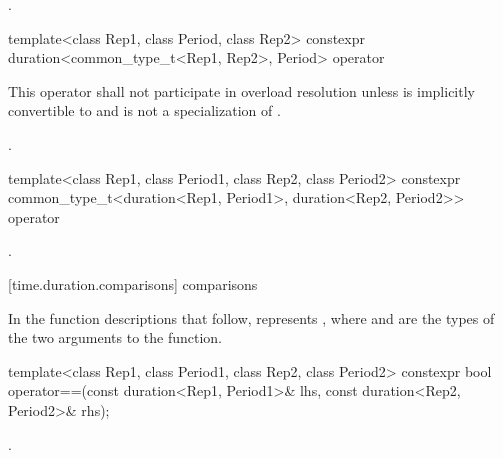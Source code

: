 \begin{itemdescr}
\pnum
\returns {}.
\end{itemdescr}

%
\begin{itemdecl}
template<class Rep1, class Period, class Rep2>
  constexpr duration<common_type_t<Rep1, Rep2>, Period>
    operator%
\end{itemdecl}

\begin{itemdescr}
\pnum
\remarks This operator shall not participate in overload
resolution unless  is implicitly convertible to  and
 is not a specialization of .

\pnum
\returns {}.
\end{itemdescr}

%
\begin{itemdecl}
template<class Rep1, class Period1, class Rep2, class Period2>
  constexpr common_type_t<duration<Rep1, Period1>, duration<Rep2, Period2>>
    operator%
\end{itemdecl}

\begin{itemdescr}
\pnum
\returns {}.
\end{itemdescr}


[time.duration.comparisons]{ comparisons}

\pnum
In the function descriptions that follow,  represents
, where  and  are the types of
the two arguments to the function.

%
\begin{itemdecl}
template<class Rep1, class Period1, class Rep2, class Period2>
  constexpr bool operator==(const duration<Rep1, Period1>& lhs,
                            const duration<Rep2, Period2>& rhs);
\end{itemdecl}

\begin{itemdescr}
\pnum
\returns {}.
\end{itemdescr}

